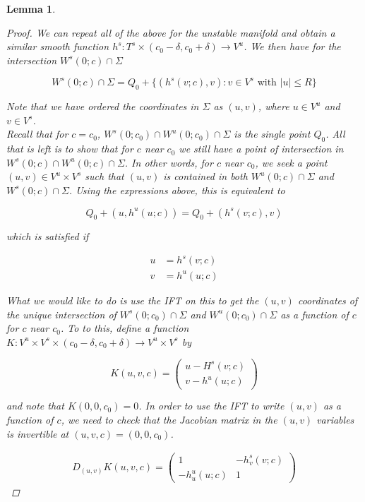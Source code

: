 \documentclass[12pt]{article}
\newtheorem{lemma}{Lemma}
\begin{document}
\begin{lemma}
\begin{proof}
We can repeat all of the above for the unstable manifold and obtain a similar smooth function $h^s: T^s \times (c_0 - \delta, c_0 + \delta) \rightarrow V^u$. We then have for the intersection $W^s(0; c) \cap \Sigma$

\[
W^s(0; c) \cap \Sigma = Q_0 + \{ (h^s(v; c), v) : v \in V^s \text{ with } |u| \leq R \}
\]

Note that we have ordered the coordinates in $\Sigma$ as $(u, v)$, where $u \in V^u$ and $v \in V^s$.\\

Recall that for $c = c_0$, $W^s(0; c_0) \cap W^u(0; c_0) \cap \Sigma$ is the single point $Q_0$. All that is left is to show that for $c$ near $c_0$ we still have a point of intersection in $W^s(0; c) \cap W^u(0; c) \cap \Sigma$. In other words, for $c$ near $c_0$, we seek a point $(u, v) \in V^u \times V^s$ such that $(u, v)$ is contained in both $W^u(0; c) \cap \Sigma$ and $W^s(0; c) \cap \Sigma$. Using the expressions above, this is equivalent to

\[
Q_0 + (u, h^u(u; c)) = Q_0 + (h^s(v; c), v)
\]

which is satisfied if

\begin{align*}
u &= h^s(v; c) \\
v &= h^u(u; c)
\end{align*}

What we would like to do is use the IFT on this to get the $(u, v)$ coordinates of the unique intersection of $W^s(0; c_0) \cap \Sigma$ and $W^u(0; c_0) \cap \Sigma$ as a function of $c$ for $c$ near $c_0$. To to this, define a function $K: V^u \times V^s \times (c_0 - \delta, c_0 + \delta) \rightarrow V^u \times V^s$ by

\begin{equation}
K(u, v, c) = \begin{pmatrix}
u - H^s(v; c) \\ v - h^u(u; c)
\end{pmatrix}
\end{equation}

and note that $K(0, 0, c_0) = 0$. In order to use the IFT to write $(u, v)$ as a function of $c$, we need to check that the Jacobian matrix in the $(u, v)$ variables is invertible at $(u, v, c) = (0, 0, c_0)$.

\begin{align*}
D_{(u, v)}K(u, v, c) = \begin{pmatrix}
1 & -h^s_v(v; c) \\
-h^u_u(u; c) & 1
\end{pmatrix}
\end{align*}


\end{proof}
\end{lemma}
\end{document}
